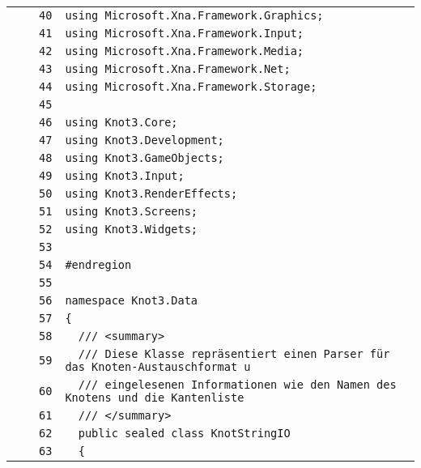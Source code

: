 \documentclass[a4paper,10pt]{article}
\begin{document}
\begin{longtable}[l]{lrrl}
\cellcolor{gray} &  & \verb~40~ & \verb~using Microsoft.Xna.Framework.Graphics;~\\
\cellcolor{gray} &  & \verb~41~ & \verb~using Microsoft.Xna.Framework.Input;~\\
\cellcolor{gray} &  & \verb~42~ & \verb~using Microsoft.Xna.Framework.Media;~\\
\cellcolor{gray} &  & \verb~43~ & \verb~using Microsoft.Xna.Framework.Net;~\\
\cellcolor{gray} &  & \verb~44~ & \verb~using Microsoft.Xna.Framework.Storage;~\\
\cellcolor{gray} &  & \verb~45~ & \verb~~\\
\cellcolor{gray} &  & \verb~46~ & \verb~using Knot3.Core;~\\
\cellcolor{gray} &  & \verb~47~ & \verb~using Knot3.Development;~\\
\cellcolor{gray} &  & \verb~48~ & \verb~using Knot3.GameObjects;~\\
\cellcolor{gray} &  & \verb~49~ & \verb~using Knot3.Input;~\\
\cellcolor{gray} &  & \verb~50~ & \verb~using Knot3.RenderEffects;~\\
\cellcolor{gray} &  & \verb~51~ & \verb~using Knot3.Screens;~\\
\cellcolor{gray} &  & \verb~52~ & \verb~using Knot3.Widgets;~\\
\cellcolor{gray} &  & \verb~53~ & \verb~~\\
\cellcolor{gray} &  & \verb~54~ & \verb~#endregion~\\
\cellcolor{gray} &  & \verb~55~ & \verb~~\\
\cellcolor{gray} &  & \verb~56~ & \verb~namespace Knot3.Data~\\
\cellcolor{gray} &  & \verb~57~ & \verb~{~\\
\cellcolor{gray} &  & \verb~58~ & \verb~  /// <summary>~\\
\cellcolor{gray} &  & \verb~59~ & \verb~  /// Diese Klasse repräsentiert einen Parser für das Knoten-Austauschformat u~\\
\cellcolor{gray} &  & \verb~60~ & \verb~  /// eingelesenen Informationen wie den Namen des Knotens und die Kantenliste~\\
\cellcolor{gray} &  & \verb~61~ & \verb~  /// </summary>~\\
\cellcolor{gray} &  & \verb~62~ & \verb~  public sealed class KnotStringIO~\\
\cellcolor{gray} &  & \verb~63~ & \verb~  {~\\

\end{longtable}
\end{document}
